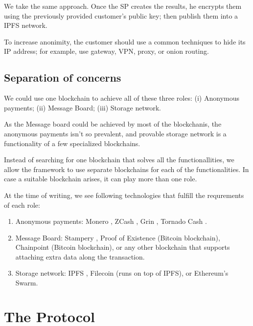 \documentclass{ieeeaccess}
\begin{document}
We take the same approach. Once the SP creates the results, he encrypts
them using the previously provided customer's public key; then publish
them into a IPFS network.

To increase anonimity, the customer should use a common techniques to
hide its IP address; for example, use gateway, VPN, proxy, or onion
routing.

\subsection{Separation of concerns}
We could use one blockchain to achieve all of these three roles: (i)
Anonymous payments; (ii) Message Board; (iii) Storage network.

As the Message board could be achieved by most of the blockchanis, the
anonymous payments isn't so prevalent, and provable storage network is a
functionality of a few specialized blockchains.

Instead of searching for one blockchain that solves all the
functionallities, we allow the framework to use separate blockchains for
each of the functionalities. In case a suitable blockchain arises, it
can play more than one role.

At the time of writing, we see following technologies that fulfill the
requrements of each role:

\begin{enumerate}
\def\labelenumi{\arabic{enumi}.}

\item Anonymous payments: Monero \cite{van2013cryptonote}, ZCash
  \cite{sasson2014zerocash}, Grin \cite{fuchsbauer2019aggregate},
  Tornado Cash \cite{pertsev2019tornado}.
\item Message Board: Stampery \cite{de2016stampery}, Proof of Existence
  \cite{proofofexistence} (Bitcoin blockchain), Chainpoint
  \cite{Chainpoi39} (Bitcoin blockchain), or any other blockchain that
  supports attaching extra data along the transaction.
\item Storage network: IPFS \cite{benet2014ipfs}, Filecoin
  \cite{benetfilecoin} (runs on top of IPFS), or Ethereum's
  Swarm\cite{swarmwhi49}.
\end{enumerate}



\section{The Protocol}
\end{document}
